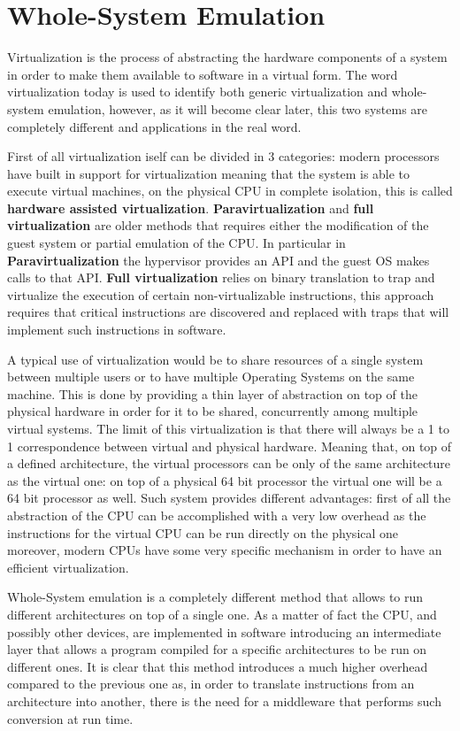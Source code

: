 \chapter{Whole-System Emulation}
\label{chap:2}

Virtualization is the process of abstracting the hardware components of a system in order to make them available to software in a virtual form.
The word virtualization today is used to identify both generic virtualization and whole-system emulation, however, as it will become clear later, this two systems are completely different and applications in the real word.

First of all virtualization iself can be divided in 3 categories: modern processors have built in support for virtualization meaning that the system is able to execute virtual machines, on the physical CPU in complete isolation, this is called \textbf{hardware assisted virtualization}. \textbf{Paravirtualization} and \textbf{full virtualization} are older methods that requires either the modification of the guest system or partial emulation of the CPU. In particular in \textbf{Paravirtualization} the hypervisor provides an API and the guest OS makes calls to that API. \textbf{Full virtualization} relies on binary translation to trap and virtualize the execution of certain non-virtualizable instructions, this approach requires that critical instructions are discovered and replaced with traps that will implement such instructions in software.

A typical use of virtualization would be to share resources of a single system between multiple users or to have multiple Operating Systems on the same machine. This is done by providing a thin layer of abstraction on top of the physical hardware in order for it to be shared, concurrently among multiple virtual systems. The limit of this virtualization is that there will always be a 1 to 1 correspondence between virtual and physical hardware. Meaning that, on top of a defined architecture, the virtual processors can be only of the same architecture as the virtual one: on top of a physical 64 bit processor the virtual one will be a 64 bit processor as well. Such system provides different advantages: first of all the abstraction of the CPU can be accomplished with a very low overhead as the instructions for the virtual CPU can be run directly on the physical one moreover, modern CPUs have some very specific mechanism in order to have an efficient virtualization.

Whole-System emulation is a completely different method that allows to run different architectures on top of a single one. As a matter of fact the CPU, and possibly other devices, are implemented in software introducing an intermediate layer that allows a program compiled for a specific architectures to be run on different ones. It is clear that this method introduces a much higher overhead compared to the previous one as, in order to translate instructions from an architecture into another, there is the need for a middleware that performs such conversion at run time.

